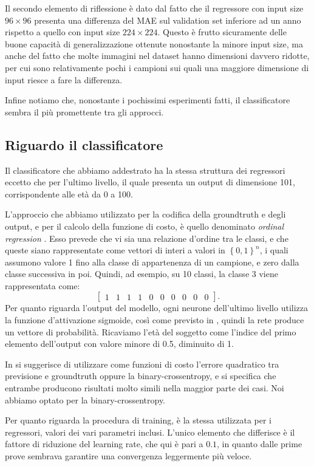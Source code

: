 Il secondo elemento di riflessione è dato dal fatto che il regressore con input size $96 \times 96$ presenta una differenza del MAE sul validation set inferiore ad un anno rispetto a quello con input size $224 \times 224$. Questo è frutto sicuramente delle buone capacità di generalizzazione ottenute nonostante la minore input size, ma anche del fatto che molte immagini nel dataset hanno dimensioni davvero ridotte, per cui sono relativamente pochi i campioni sui quali una maggiore dimensione di input riesce a fare la differenza.

Infine notiamo che, nonostante i pochissimi esperimenti fatti, il classificatore sembra il più promettente tra gli approcci.

\subsection{Riguardo il classificatore}

Il classificatore che abbiamo addestrato ha la stessa struttura dei regressori eccetto che per l'ultimo livello, il quale presenta un output di dimensione 101, corrispondente alle età da 0 a 100. 

L'approccio che abbiamo utilizzato per la codifica della groundtruth e degli output, e per il calcolo della funzione di costo, è quello denominato \emph{ordinal regression} \cite{ordinalregression}. Esso prevede che vi sia una relazione d'ordine tra le classi, e che queste siano rappresentate come vettori di interi a valori in $\left\{0,1\right\}^n$, i quali assumono valore 1 fino alla classe di appartenenza di un campione, e zero dalla classe successiva in poi. Quindi, ad esempio, su 10 classi, la classe 3 viene rappresentata come:
\begin{displaymath}
    \begin{bmatrix}
    1 & 1 & 1 & 1 & 0 & 0 & 0 & 0 & 0 & 0
    \end{bmatrix}.
\end{displaymath}
Per quanto riguarda l'output del modello, ogni neurone dell'ultimo livello utilizza la funzione d'attivazione sigmoide, così come previsto in \cite{ordinalregression}, quindi la rete produce un vettore di probabilità. Ricaviamo l'età del soggetto come l'indice del primo elemento dell'output con valore minore di 0.5, diminuito di 1. 

In \cite{ordinalregression} si suggerisce di utilizzare come funzioni di costo l'errore quadratico tra previsione e groundtruth oppure la binary-crossentropy, e si specifica che entrambe producono risultati molto simili nella maggior parte dei casi. Noi abbiamo optato per la binary-crossentropy. 

Per quanto riguarda la procedura di training, è la stessa utilizzata per i regressori, valori dei vari parametri inclusi. L'unico elemento che differisce è il fattore di riduzione del learning rate, che qui è pari a $0.1$, in quanto dalle prime prove sembrava garantire una convergenza leggermente più veloce.
